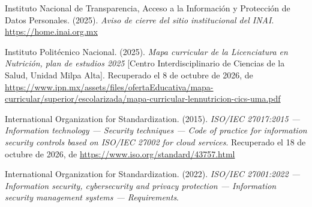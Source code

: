 \documentclass[12pt, a4paper]{article}
\begin{document}
\begin{list}{}{\setlength{\leftmargin}{1.27cm}\setlength{\itemindent}{-1.27cm}%
  \setlength{\labelwidth}{0pt}\setlength{\labelsep}{0pt}\setlength{\itemsep}{6pt}}
 
\item Instituto Nacional de Transparencia, Acceso a la Información
  y Protección de Datos Personales. (2025).
  \textit{Aviso de cierre del sitio institucional del INAI}.
  \url{https://home.inai.org.mx}


\item Instituto Politécnico Nacional. (2025). \textit{Mapa curricular de la
  Licenciatura en Nutrición, plan de estudios 2025} [Centro
  Interdisciplinario de Ciencias de la Salud, Unidad Milpa Alta]. Recuperado el 8 de octubre de 2026, de \url{https://www.ipn.mx/assets/files/ofertaEducativa/mapa-curricular/superior/escolarizada/mapa-curricular-lennutricion-cics-uma.pdf}
 

\item International Organization for Standardization. (2015).
  \textit{ISO/IEC 27017:2015 --- Information technology --- Security
  techniques --- Code of practice for information security controls
  based on ISO/IEC 27002 for cloud services}.
  Recuperado el 18 de octubre de 2026, de \url{https://www.iso.org/standard/43757.html}
 

\item International Organization for Standardization. (2022).
  \textit{ISO/IEC 27001:2022 --- Information security, cybersecurity
  and privacy protection --- Information security management systems
  --- Requirements}.



\end{list}
\end{document}
